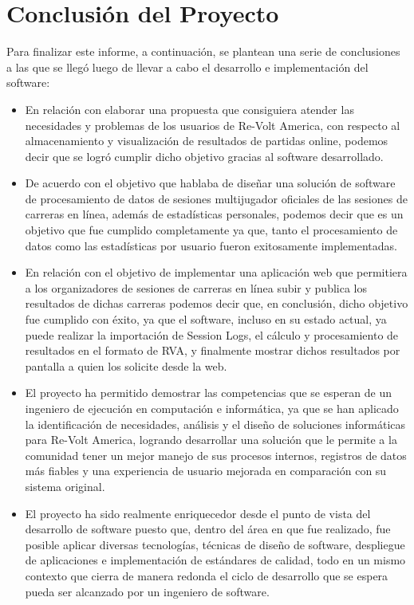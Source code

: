 \chapter{Conclusión del Proyecto}
Para finalizar este informe, a continuación, se plantean una serie de conclusiones a las que se llegó luego de llevar a cabo el desarrollo e implementación del software:

\begin{itemize}
	\item En relación con elaborar una propuesta que consiguiera atender las necesidades y problemas de los usuarios de Re-Volt America, con respecto al almacenamiento y visualización de resultados de partidas online, podemos decir que se logró cumplir dicho objetivo gracias al software desarrollado.
	\item De acuerdo con el objetivo que hablaba de diseñar una solución de software de procesamiento de datos de sesiones multijugador oficiales de las sesiones de carreras en línea, además de estadísticas personales, podemos decir que es un objetivo que fue cumplido completamente ya que, tanto el procesamiento de datos como las estadísticas por usuario fueron exitosamente implementadas.
	\item En relación con el objetivo de implementar una aplicación web que permitiera a los organizadores de sesiones de carreras en línea subir y publica los resultados de dichas carreras podemos decir que, en conclusión, dicho objetivo fue cumplido con éxito, ya que el software, incluso en su estado actual, ya puede realizar la importación de Session Logs, el cálculo y procesamiento de resultados en el formato de RVA, y finalmente mostrar dichos resultados por pantalla a quien los solicite desde la web.
	\item El proyecto ha permitido demostrar las competencias que se esperan de un ingeniero de ejecución en computación e informática, ya que se han aplicado la identificación de necesidades, análisis y el diseño de soluciones informáticas para Re-Volt America, logrando desarrollar una solución que le permite a la comunidad tener un mejor manejo de sus procesos internos, registros de datos más fiables y una experiencia de usuario mejorada en comparación con su sistema original. 
	\item El proyecto ha sido realmente enriquecedor desde el punto de vista del desarrollo de software puesto que, dentro del área en que fue realizado, fue posible aplicar diversas tecnologías, técnicas de diseño de software, despliegue de aplicaciones e implementación de estándares de calidad, todo en un mismo contexto que cierra de manera redonda el ciclo de desarrollo que se espera pueda ser alcanzado por un ingeniero de software.
\end{itemize}
